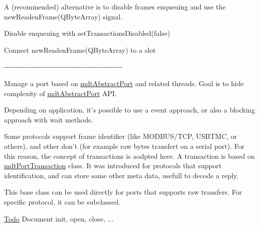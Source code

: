 A (recommended) alternative is to disable frames enqueuing and use the newReadenFrame(QByteArray) signal.
\begin{DoxyItemize}
\item Disable enqueuing with setTransactionsDisabled(false)
\item Connect newReadenFrame(QByteArray) to a slot
\end{DoxyItemize}

-\/-\/-\/-\/-\/-\/-\/-\/-\/-\/-\/-\/-\/-\/-\/-\/-\/-\/-\/-\/-\/-\/-\/-\/-\/-\/-\/-\/-\/-\/-\/-\/-\/-\/-\/-\/-\/-\/-\/-\/-\/-\/-\/-\/-\/-\/-\/-\/-\/-\/-\/

Manage a port based on \hyperlink{classmdt_abstract_port}{mdtAbstractPort} and related threads. Goal is to hide complexity of \hyperlink{classmdt_abstract_port}{mdtAbstractPort} API.

Depending on application, it's possible to use a event approach, or also a blocking approach with wait methods.

Some protocols support frame identifier (like MODBUS/TCP, USBTMC, or others), and other don't (for example raw bytes transfert on a serial port). For this reason, the concept of transactions is aodpted here. A transaction is based on \hyperlink{classmdt_port_transaction}{mdtPortTransaction} class. It was introduced for protocols that support identification, and can store some other meta data, usefull to decode a reply.

This base class can be used directly for ports that supports raw transfers. For specific protocol, it can be subclassed.

\begin{Desc}
\item[\hyperlink{todo__todo000022}{Todo}]Document init, open, close, ...\end{Desc}


